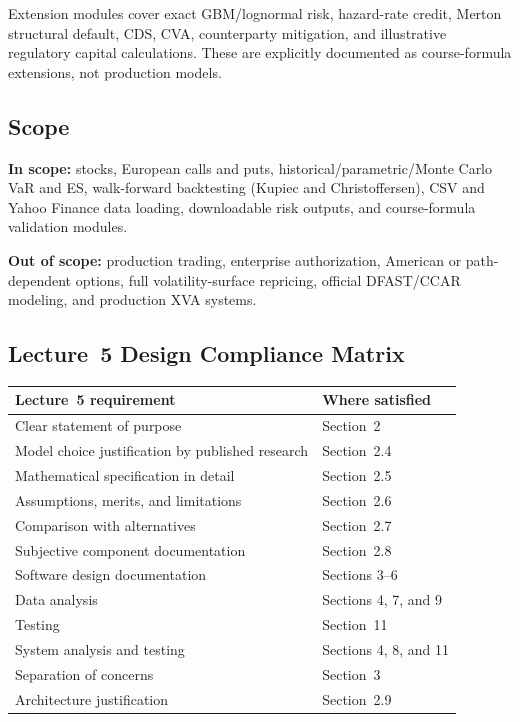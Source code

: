 \documentclass[11pt]{article}
\begin{document}
Extension modules cover exact GBM/lognormal risk, hazard-rate credit,
Merton structural default, CDS, CVA, counterparty mitigation, and
illustrative regulatory capital calculations.  These are explicitly
documented as course-formula extensions, not production models.

\subsection{Scope}

\textbf{In scope:}
stocks, European calls and puts, historical/parametric/Monte Carlo VaR and
ES, walk-forward backtesting (Kupiec and Christoffersen), CSV and Yahoo
Finance data loading, downloadable risk outputs, and course-formula
validation modules.

\textbf{Out of scope:}
production trading, enterprise authorization, American or path-dependent
options, full volatility-surface repricing, official DFAST/CCAR modeling,
and production XVA systems.

\subsection{Lecture~5 Design Compliance Matrix}

\begin{center}
\begin{tabular}{L{6.5cm}L{7.5cm}}
\toprule
\textbf{Lecture~5 requirement} & \textbf{Where satisfied} \\
\midrule
Clear statement of purpose & Section~2 \\
Model choice justification by published research & Section~2.4 \\
Mathematical specification in detail & Section~2.5 \\
Assumptions, merits, and limitations & Section~2.6 \\
Comparison with alternatives & Section~2.7 \\
Subjective component documentation & Section~2.8 \\
Software design documentation & Sections 3--6 \\
Data analysis & Sections 4, 7, and 9 \\
Testing & Section~11 \\
System analysis and testing & Sections 4, 8, and 11 \\
Separation of concerns & Section~3 \\
Architecture justification & Section~2.9 \\
\bottomrule
\end{tabular}
\end{center}
\end{document}
